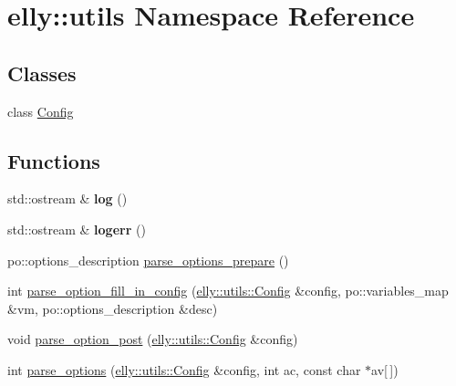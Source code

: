 \hypertarget{namespaceelly_1_1utils}{\section{elly\-:\-:utils Namespace Reference}
\label{namespaceelly_1_1utils}
}
\subsection*{Classes}
\begin{DoxyCompactItemize}
\item 
class \hyperlink{classelly_1_1utils_1_1_config}{Config}
\end{DoxyCompactItemize}
\subsection*{Functions}
\begin{DoxyCompactItemize}
\item 
\hypertarget{namespaceelly_1_1utils_a21eaaac92eea396de6b56ca69290e1dd}{std\-::ostream \& {\bfseries log} ()}\label{namespaceelly_1_1utils_a21eaaac92eea396de6b56ca69290e1dd}

\item 
\hypertarget{namespaceelly_1_1utils_afb4db811a1ef00fe28ac26fb825e6e1a}{std\-::ostream \& {\bfseries logerr} ()}\label{namespaceelly_1_1utils_afb4db811a1ef00fe28ac26fb825e6e1a}

\item 
po\-::options\-\_\-description \hyperlink{namespaceelly_1_1utils_a869ba258b40c7aded89198ea2ae3f482}{parse\-\_\-options\-\_\-prepare} ()
\item 
int \hyperlink{namespaceelly_1_1utils_acbe0097a93a185ab0b3d9080cc6e108a}{parse\-\_\-option\-\_\-fill\-\_\-in\-\_\-config} (\hyperlink{classelly_1_1utils_1_1_config}{elly\-::utils\-::\-Config} \&config, po\-::variables\-\_\-map \&vm, po\-::options\-\_\-description \&desc)
\item 
void \hyperlink{namespaceelly_1_1utils_a030f05e28622556605fc771140200e1b}{parse\-\_\-option\-\_\-post} (\hyperlink{classelly_1_1utils_1_1_config}{elly\-::utils\-::\-Config} \&config)
\item 
int \hyperlink{namespaceelly_1_1utils_a1a2e5aa86b48ab66da11c317ed50630f}{parse\-\_\-options} (\hyperlink{classelly_1_1utils_1_1_config}{elly\-::utils\-::\-Config} \&config, int ac, const char $\ast$av\mbox{[}$\,$\mbox{]})
\end{DoxyCompactItemize}


